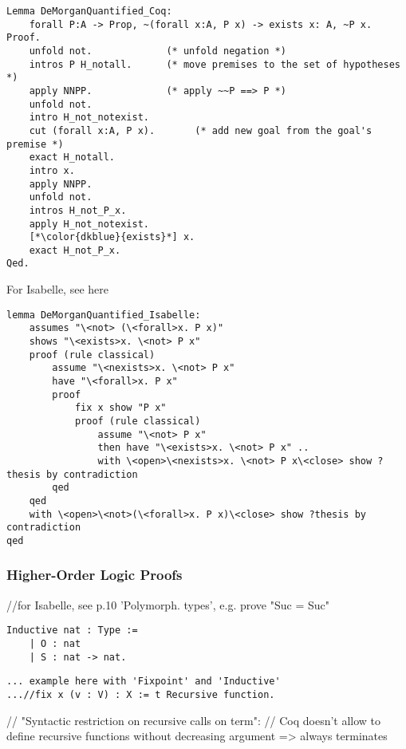 \documentclass[article]{aaltoseries}
\begin{document}
\begin{lstlisting}[language=coq]
Lemma DeMorganQuantified_Coq:
    forall P:A -> Prop, ~(forall x:A, P x) -> exists x: A, ~P x.
Proof.
    unfold not.             (* unfold negation *)
    intros P H_notall.      (* move premises to the set of hypotheses *)
    apply NNPP.             (* apply ~~P ==> P *)
    unfold not.
    intro H_not_notexist.
    cut (forall x:A, P x).       (* add new goal from the goal's premise *)
    exact H_notall.
    intro x.
    apply NNPP.
    unfold not.
    intros H_not_P_x.
    apply H_not_notexist.
    [*\color{dkblue}{exists}*] x.
    exact H_not_P_x.
Qed.
\end{lstlisting}

 
For Isabelle, see here %
\begin{lstlisting}[language=isabelle]
lemma DeMorganQuantified_Isabelle:
    assumes "\<not> (\<forall>x. P x)"
    shows "\<exists>x. \<not> P x"
    proof (rule classical)
        assume "\<nexists>x. \<not> P x"
        have "\<forall>x. P x"
        proof
            fix x show "P x"
            proof (rule classical)
                assume "\<not> P x"
                then have "\<exists>x. \<not> P x" ..
                with \<open>\<nexists>x. \<not> P x\<close> show ?thesis by contradiction
        qed
    qed
    with \<open>\<not>(\<forall>x. P x)\<close> show ?thesis by contradiction
qed
\end{lstlisting}



\subsubsection{Higher-Order Logic Proofs}

//for Isabelle, see p.10 'Polymorph. types', e.g. prove "Suc = Suc" %




\begin{lstlisting}[language=coq]
Inductive nat : Type :=
	| O : nat
	| S : nat -> nat.
\end{lstlisting}

\begin{lstlisting}[caption={Recursive function definition: factorial}]
... example here with 'Fixpoint' and 'Inductive'
...//fix x (v : V) : X := t Recursive function.
\end{lstlisting}
// "Syntactic restriction on recursive calls on term":
// Coq doesn't allow to define recursive functions without decreasing argument => always terminates
\end{document}
